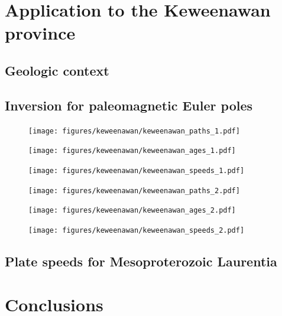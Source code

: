 \documentclass[preprint,12pt,authoryear]{elsarticle}
\begin{document}
\section{Application to the Keweenawan province}
\label{sec:keweenawan}
\subsection{Geologic context}
\citet{swanson2009no}
\subsection{Inversion for paleomagnetic Euler poles}
\clearpage
\begin{figure}
\texttt{[image: figures/keweenawan/keweenawan\_paths\_1.pdf]}
\caption{}
\label{fig:keweenawan_paths_1}
\end{figure}
\begin{figure}
\texttt{[image: figures/keweenawan/keweenawan\_ages\_1.pdf]}
\caption{}
\label{fig:keweenawan_ages_1}
\end{figure}
\begin{figure}
\texttt{[image: figures/keweenawan/keweenawan\_speeds\_1.pdf]}
\caption{}
\label{fig:keweenawan_speeds_1}
\end{figure}
\begin{figure}
\texttt{[image: figures/keweenawan/keweenawan\_paths\_2.pdf]}
\caption{}
\label{fig:keweenawan_paths_2}
\end{figure}
\begin{figure}
\texttt{[image: figures/keweenawan/keweenawan\_ages\_2.pdf]}
\caption{}
\label{fig:keweenawan_ages_2}
\end{figure}
\begin{figure}
\texttt{[image: figures/keweenawan/keweenawan\_speeds\_2.pdf]}
\caption{}
\label{fig:keweenawan_speeds_2}
\end{figure}
\subsection{Plate speeds for Mesoproterozoic Laurentia}

\section{Conclusions}
\label{sec:conclusions}





 


\end{document}
